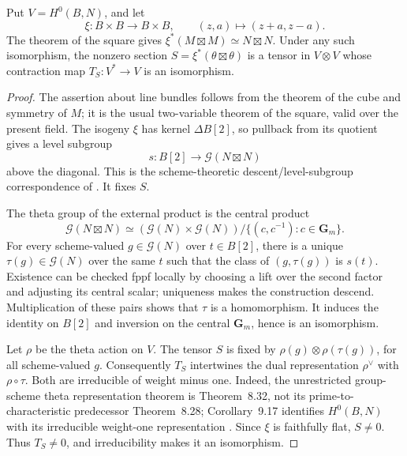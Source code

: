 \begin{lemma}
\label{lem:principal-theta-addition-perfect}
Put \(V=H^0(B,N)\), and let
\[
 \xi:B\times B\longrightarrow B\times B,
 \qquad (z,a)\longmapsto(z+a,z-a).
\]
The theorem of the square gives
\(\xi^*(M\boxtimes M)\simeq N\boxtimes N\).
Under any such isomorphism, the nonzero section
\(S=\xi^*(\theta\boxtimes\theta)\) is a tensor in \(V\otimes V\)
whose contraction map \(T_S:V^*\to V\) is an isomorphism.
\end{lemma}
\begin{proof}
The assertion about line bundles follows from the theorem of the cube
and symmetry of \(M\); it is the usual two-variable theorem of the
square, valid over the present field.  The isogeny \(\xi\) has kernel
\(\Delta B[2]\), so pullback from its quotient gives a level subgroup
\[
 s:B[2]\longrightarrow\mathcal G(N\boxtimes N)
\]
above the diagonal.  This is the scheme-theoretic descent/level-subgroup
correspondence of \citet[Theorem~8.10 and Corollary~8.14,
pp.~116--117]{EdixhovenVanDerGeerMoonenAV}.
It fixes \(S\).

The theta group of the external product is the central product
\[
 \mathcal G(N\boxtimes N)
  \simeq(\mathcal G(N)\times\mathcal G(N))
          /\{(c,c^{-1}):c\in\mathbf G_m\}.
\]
For every scheme-valued \(g\in\mathcal G(N)\) over
\(t\in B[2]\), there is a unique \(\tau(g)\in\mathcal G(N)\)
over the same \(t\) such that the class of \((g,\tau(g))\)
is \(s(t)\).  Existence can be checked fppf locally by choosing a lift
over the second factor and adjusting its central scalar; uniqueness
makes the construction descend.  Multiplication of these pairs shows
that \(\tau\) is a homomorphism.  It induces the identity on \(B[2]\)
and inversion on the central \(\mathbf G_m\), hence is an isomorphism.

Let \(\rho\) be the theta action on \(V\).  The tensor \(S\) is
fixed by \(\rho(g)\otimes\rho(\tau(g))\), for all scheme-valued
\(g\).  Consequently \(T_S\) intertwines the dual representation
\(\rho^\vee\) with \(\rho\circ\tau\).  Both are irreducible of
weight minus one.  Indeed, the unrestricted group-scheme theta
representation theorem is Theorem~8.32, not its prime-to-characteristic
predecessor Theorem~8.28; Corollary~9.17 identifies \(H^0(B,N)\) with
its irreducible weight-one representation
\citep[pp.~124--125, 133--134]{EdixhovenVanDerGeerMoonenAV}.
Since \(\xi\) is faithfully flat, \(S\ne0\).  Thus \(T_S\ne0\),
and irreducibility makes it an isomorphism.


\end{proof}
